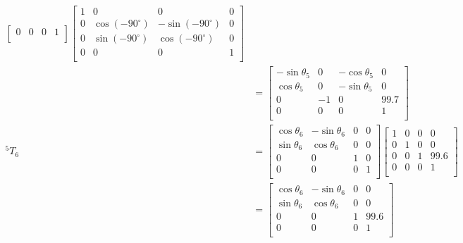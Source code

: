 \documentclass[UTF8, 13pt]{ctexart}
\begin{document}
\[\begin{aligned}
\begin{bmatrix}
        0 & 0 & 0 & 1 \\
        \end{bmatrix}
        \begin{bmatrix}
        1 & 0 & 0 & 0 \\
        0 & \cos(-90^\circ) & -\sin(-90^\circ) & 0 \\
        0 & \sin(-90^\circ) & \cos(-90^\circ) & 0 \\
        0 & 0 & 0 & 1 \\
        \end{bmatrix} \\
        &= \begin{bmatrix}
        -\sin\theta_5 & 0 & -\cos\theta_5 & 0 \\
        \cos\theta_5 & 0 & -\sin\theta_5 & 0 \\
        0 & -1 & 0 & 99.7 \\
        0 & 0 & 0 & 1 \\
        \end{bmatrix} \\
{}^5T_6 &= \begin{bmatrix}
        \cos\theta_6 & -\sin\theta_6 & 0 & 0 \\
        \sin\theta_6 & \cos\theta_6 & 0 & 0 \\
        0 & 0 & 1 & 0 \\
        0 & 0 & 0 & 1 \\
        \end{bmatrix}
        \begin{bmatrix}
        1 & 0 & 0 & 0 \\
        0 & 1 & 0 & 0 \\
        0 & 0 & 1 & 99.6 \\
        0 & 0 & 0 & 1 \\
        \end{bmatrix} \\
        &= \begin{bmatrix}
        \cos\theta_6 & -\sin\theta_6 & 0 & 0 \\
        \sin\theta_6 & \cos\theta_6 & 0 & 0 \\
        0 & 0 & 1 & 99.6 \\
        0 & 0 & 0 & 1 \\
        \end{bmatrix}
\end{aligned}
\]
\end{document}
